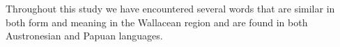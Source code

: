 Throughout this study we have encountered several words that
are similar in both form
and meaning in the Wallacean region
and are found in both Austronesian and Papuan languages.


